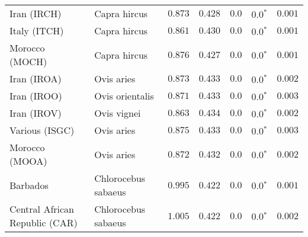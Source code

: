 \begin{center}
\begin{adjustbox}{width = 1\textwidth}
\begin{tabular}{|l|l|r|r|r|r|r|}
                    Iran (IRCH) &         Capra hircus &                                           $ 0.873$ &                                           $ 0.428$ &            $0.0$ &                  $\bm{0.0{^*}}$ &           $ 0.001$ \\
                   Italy (ITCH) &         Capra hircus &                                           $ 0.861$ &                                           $ 0.430$ &            $0.0$ &                  $\bm{0.0{^*}}$ &           $ 0.001$ \\
                 Morocco (MOCH) &         Capra hircus &                                           $ 0.876$ &                                           $ 0.427$ &            $0.0$ &                  $\bm{0.0{^*}}$ &           $ 0.001$ \\
                    Iran (IROA) &           Ovis aries &                                           $ 0.873$ &                                           $ 0.433$ &            $0.0$ &                  $\bm{0.0{^*}}$ &           $ 0.002$ \\
                    Iran (IROO) &      Ovis orientalis &                                           $ 0.871$ &                                           $ 0.433$ &            $0.0$ &                  $\bm{0.0{^*}}$ &           $ 0.003$ \\
                    Iran (IROV) &          Ovis vignei &                                           $ 0.863$ &                                           $ 0.434$ &            $0.0$ &                  $\bm{0.0{^*}}$ &           $ 0.002$ \\
                 Various (ISGC) &           Ovis aries &                                           $ 0.875$ &                                           $ 0.433$ &            $0.0$ &                  $\bm{0.0{^*}}$ &           $ 0.003$ \\
                 Morocco (MOOA) &           Ovis aries &                                           $ 0.872$ &                                           $ 0.432$ &            $0.0$ &                  $\bm{0.0{^*}}$ &           $ 0.002$ \\
                       Barbados &  Chlorocebus sabaeus &                                           $ 0.995$ &                                           $ 0.422$ &            $0.0$ &                  $\bm{0.0{^*}}$ &           $ 0.001$ \\
 Central African Republic (CAR) &  Chlorocebus sabaeus &                                           $ 1.005$ &                                           $ 0.422$ &            $0.0$ &                  $\bm{0.0{^*}}$ &           $ 0.002$ \\

\end{tabular}
\end{adjustbox}
\end{center}
